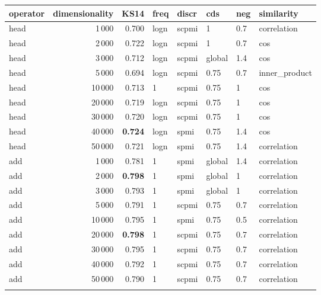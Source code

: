 \begin{tabular}{lrrlllll}
\toprule
operator &  dimensionality &   KS14 &  freq &  discr &     cds &  neg &     similarity \\
\midrule
    head &            1\,000 &  0.700 &  logn &  scpmi &       1 &  0.7 &    correlation \\
    head &            2\,000 &  0.722 &  logn &  scpmi &       1 &  0.7 &            cos \\
    head &            3\,000 &  0.712 &  logn &  scpmi &  global &  1.4 &            cos \\
    head &            5\,000 &  0.694 &  logn &  scpmi &    0.75 &  0.7 &  inner\_product \\
    head &           10\,000 &  0.713 &     1 &  scpmi &    0.75 &    1 &            cos \\
    head &           20\,000 &  0.719 &  logn &  scpmi &    0.75 &    1 &            cos \\
    head &           30\,000 &  0.720 &  logn &  scpmi &    0.75 &    1 &            cos \\
    head &           40\,000 &  \textbf{0.724} &  logn &   spmi &    0.75 &  1.4 &            cos \\
    head &           50\,000 &  0.721 &  logn &   spmi &    0.75 &  1.4 &    correlation \\ \addlinespace
     add &            1\,000 &  0.781 &     1 &   spmi &  global &  1.4 &    correlation \\
     add &            2\,000 &  \textbf{0.798} &     1 &   spmi &  global &    1 &    correlation \\
     add &            3\,000 &  0.793 &     1 &   spmi &  global &    1 &    correlation \\
     add &            5\,000 &  0.791 &     1 &  scpmi &    0.75 &  0.7 &    correlation \\
     add &           10\,000 &  0.795 &     1 &   spmi &    0.75 &  0.5 &    correlation \\
     add &           20\,000 &  \textbf{0.798} &     1 &  scpmi &    0.75 &  0.7 &    correlation \\
     add &           30\,000 &  0.795 &     1 &  scpmi &    0.75 &  0.7 &    correlation \\
     add &           40\,000 &  0.792 &     1 &  scpmi &    0.75 &  0.7 &    correlation \\
     add &           50\,000 &  0.790 &     1 &  scpmi &    0.75 &  0.7 &    correlation \\ \addlinespace

\end{tabular}
